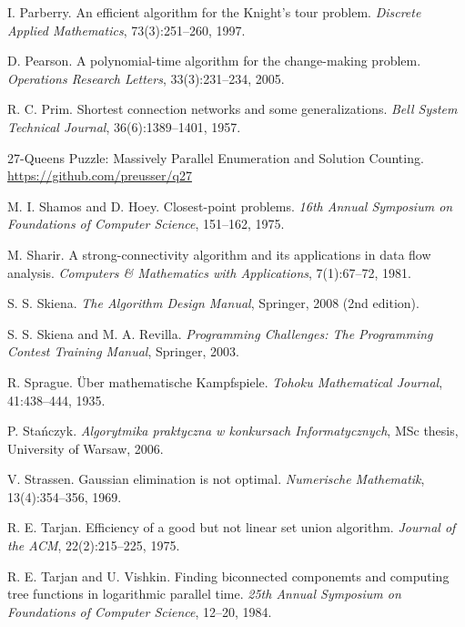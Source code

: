 \begin{thebibliography}{9}
  I. Parberry.
  An efficient algorithm for the Knight's tour problem.
  \emph{Discrete Applied Mathematics}, 73(3):251--260, 1997.


  D. Pearson.
  A polynomial-time algorithm for the change-making problem.
  \emph{Operations Research Letters}, 33(3):231--234, 2005.

  R. C. Prim.
  Shortest connection networks and some generalizations.
  \emph{Bell System Technical Journal}, 36(6):1389--1401, 1957.


  27-Queens Puzzle: Massively Parallel Enumeration and Solution Counting.
  \url{https://github.com/preusser/q27}

  M. I. Shamos and D. Hoey.
  Closest-point problems.
  \emph{16th Annual Symposium on Foundations of Computer Science}, 151--162, 1975.

  M. Sharir.
  A strong-connectivity algorithm and its applications in data flow analysis.
  \emph{Computers \& Mathematics with Applications}, 7(1):67--72, 1981.

  S. S. Skiena.
  \emph{The Algorithm Design Manual}, Springer, 2008 (2nd edition).

  S. S. Skiena and M. A. Revilla.
  \emph{Programming Challenges: The Programming Contest Training Manual},
  Springer, 2003.

  R. Sprague.
  Über mathematische Kampfspiele.
  \emph{Tohoku Mathematical Journal}, 41:438--444, 1935.

  P. Stańczyk.
  \emph{Algorytmika praktyczna w konkursach Informatycznych},
  MSc thesis, University of Warsaw, 2006.

  V. Strassen.
  Gaussian elimination is not optimal.
  \emph{Numerische Mathematik}, 13(4):354--356, 1969.

  R. E. Tarjan.
  Efficiency of a good but not linear set union algorithm.
  \emph{Journal of the ACM}, 22(2):215--225, 1975.

  R. E. Tarjan and U. Vishkin.
  Finding biconnected componemts and computing tree functions in logarithmic parallel time.
  \emph{25th Annual Symposium on Foundations of Computer Science}, 12--20, 1984.


\end{thebibliography}
